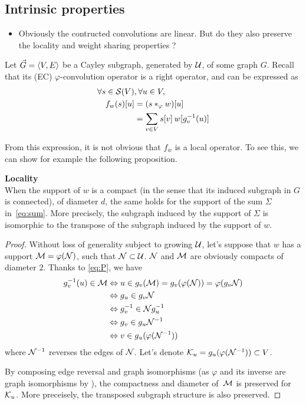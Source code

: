 \subsection{Intrinsic properties}

\begin{itemize}
  \item Obviously the contructed convolutions are linear. But do they also preserve the locality and weight sharing properties ?
\end{itemize}

Let $\vgve$ be a Cayley subgraph, generated by $\cu$, of some graph $G$. Recall that its (EC) $\varphi$-convolution operator is a right operator, and can be expressed as
\begin{align}
\forall s \in \cs(V) &, \forall u \in V,\nonumber\\
f_w(s)[u] & = (s \ast_{\varphi} w) [u]\nonumber\\
          & = \displaystyle\sum_{v \in V} s[v] \h{2} w[g_v^{-1}(u)] \label{eq:sum}
\end{align}

From this expression, it is not obvious that $f_w$ is a local operator. To see this, we can show for example the following proposition.

\begin{proposition}\textbf{Locality}\\
When the support of $w$ is a compact (in the sense that its induced subgraph in $G$ is connected), of diameter $d$, the same holds for the support of the sum $\Sigma$ in~\eqref{eq:sum}. More precisely, the subgraph induced by the support of $\Sigma$ is isomorphic to the transpose of the subgraph induced by the support of $w$.
\end{proposition}

\begin{proof}
Without loss of generality subject to growing $\cu$, let's suppose that $w$ has a support $\cm = \varphi(\cn)$, such that $\cn \subset \cu$. $\cn$ and $\cm$ are obviously compacts of diameter $2$. Thanks to \eqref{eq:P}, we have 
\begin{align*}
g_v^{-1}(u) \in \cm & \Leftrightarrow u \in g_v(\cm) = g_v(\varphi(\cn)) = \varphi(g_v\cn)\\
& \Leftrightarrow g_u \in g_v\cn\\
& \Leftrightarrow g_v^{-1} \in \cn g_u^{-1}\\
& \Leftrightarrow g_v \in g_u \cn^{-1}\\
& \Leftrightarrow v \in g_u(\varphi(\cn^{-1}))\\
\end{align*}
where $\cn^{-1}$ reverses the edges of $\cn$. Let's denote $\ck_u = g_u(\varphi(\cn^{-1})) \subset V$.

By composing edge reversal and graph isomorphisms (as $\varphi$ and its inverse are graph isomorphisms by ), the compactness and diameter of~$\cm$ is preserved for $\ck_u$. More preceisely, the transposed subgraph structure is also preserved.
\end{proof}

